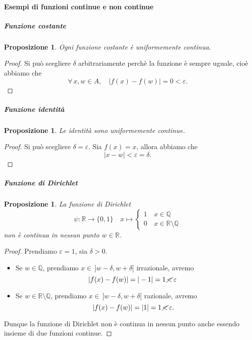 \documentclass{article}
\theoremstyle{plain}
\newtheorem{prop}[thm]{Proposizione}
\theoremstyle{definition}
\theoremstyle{remark}
\begin{document}
\vspace{10pt}

\paragraph{Esempi di funzioni continue e non continue}
\subparagraph{Funzione costante}
\begin{bxthm}
\begin{prop}
Ogni funzione costante è uniformemente continua.
\end{prop}
\end{bxthm}
\begin{proof}
    Si può scegliere $\delta$ arbitrariamente perchè la funzione è sempre uguale, cioè abbiamo che \[\forall\,x,w\in A,\quad |f(x)-f(w)| = 0 < \varepsilon.\]
\end{proof}

\vspace{10pt}

\subparagraph{Funzione identità}
\begin{bxthm}
\begin{prop}
Le identità sono uniformemente continue.
\end{prop}
\end{bxthm}
\begin{proof}
    Si può scegliere $\delta=\varepsilon$. Sia $f(x)=x$, allora abbiamo che \[|x-w|<\varepsilon=\delta.\]
\end{proof}

\vspace{10pt}

\subparagraph{Funzione di Dirichlet}
\begin{bxthm}
\begin{prop}
    La funzione di Dirichlet
    \[\psi:\mathbb{R}\to\{0,1\}\quad x\mapsto\begin{cases}1\quad x\in\mathbb{Q}\\ 0\quad x\in\mathbb{R}\setminus\mathbb{Q}\end{cases}\]
    non è continua in nessun punto $w\in\mathbb{R}$.
\end{prop}
\end{bxthm}
\begin{proof}
    Prendiamo $\varepsilon=1$, sia $\delta>0$. 
    \begin{itemize}
        \item Se $w\in\mathbb{Q}$, prendiamo $x\in \,]w-\delta, w+\delta[$ irrazionale,
        avremo \[|f(x)-f(w)| = |-1| = 1 \,\cancel{<}\,\varepsilon\;\]
        \item Se $w\in\mathbb{R}\setminus\mathbb{Q}$, prendiamo $x\in\,]w-\delta,w+\delta[$ razionale, 
        avremo \[|f(x)-f(w)| = |1| = 1 \, \cancel{<}\,\varepsilon.\]
    \end{itemize}
    Dunque la funzione di Dirichlet non è continua in nessun punto anche essendo insieme di due funzioni continue.
\end{proof}
\end{document}
